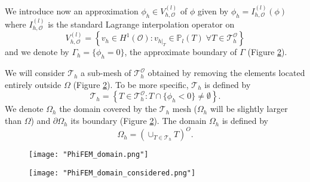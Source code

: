 We introduce now an approximation $\phi_h\in V_{h,\mathcal{O}}^{(l)}$ of $\phi$ given by $\phi_h=I_{h,\mathcal{O}}^{(l)}(\phi)$ where $I_{h,\mathcal{O}}^{(l)}$ is the standard Lagrange interpolation operator on
\begin{equation*}
	V_{h,\mathcal{O}}^{(l)}=\left\{v_h\in H^1(\mathcal{O}):v_{h|_T}\in\mathbb{P}_l(T) \;  \forall T\in\mathcal{T}_h^\mathcal{O}\right\}
\end{equation*}
and we denote by $\Gamma_h=\{\phi_h=0\}$, the approximate boundary of $\Gamma$ (Figure \ref{space3}).

We will consider $\mathcal{T}_h$ a sub-mesh of $\mathcal{T}_h^\mathcal{O}$ obtained by removing the elements located entirely outside $\Omega$ (Figure \ref{space3}). To be more specific, $\mathcal{T}_h$ is defined by
\begin{equation*}
	\mathcal{T}_h=\left\{T\in \mathcal{T}_h^\mathcal{O}:T\cap\{\phi_h<0\}\ne\emptyset\right\}.
\end{equation*}
We denote $\Omega_h$ the domain covered by the $\mathcal{T}_h$ mesh ($\Omega_h$ will be slightly larger than $\Omega$) and $\partial\Omega_h$ its boundary (Figure \ref{space3}). The domain $\Omega_h$ is defined by
\begin{equation*}
	\Omega_h=\left(\cup_{T\in\mathcal{T}_h}T\right)^O.
\end{equation*}

\begin{minipage}{0.52\linewidth}
	\begin{figure}[H]
		\centering
		\texttt{[image: "PhiFEM\_domain.png"]}
		\label{space2}
	\end{figure}
\end{minipage} \;
\begin{minipage}{0.44\linewidth}
	\begin{figure}[H]
		\centering
		\texttt{[image: "PhiFEM\_domain\_considered.png"]}
		\label{space3}
	\end{figure}
\end{minipage}


